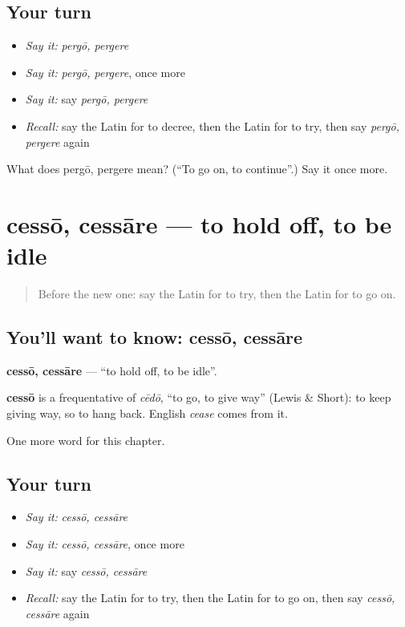 \subsection*{Your turn}
\begin{itemize}
\raggedright
  \item \emph{Say it:} \emph{pergō, pergere}
  \item \emph{Say it:} \emph{pergō, pergere}, once more
  \item \emph{Say it:} say \emph{pergō, pergere}
  \item \emph{Recall:} say the Latin for to decree, then the Latin for to try, then say \emph{pergō, pergere} again
\end{itemize}

\begin{tcolorbox}[breakable,colback=teal!4,colframe=teal!35!black,title={Before you move on}]
What does pergō, pergere mean? (\textquotedblleft{}To go on, to continue\textquotedblright{}.) Say it once more.
\end{tcolorbox}
\section[cessō, cessāre]{cessō, cessāre — to hold off, to be idle}

\label{lesson:LA-C229-cesso}



\begin{quote}
Before the new one: say the Latin for to try, then the Latin for to go on.
\end{quote}

\subsection*{You'll want to know: cessō, cessāre}
\textbf{cessō, cessāre} — \textquotedblleft{}to hold off, to be idle\textquotedblright{}.

\begin{cousinweb}
\textbf{cessō} is a frequentative of \emph{cēdō}, \textquotedblleft{}to go, to give way\textquotedblright{} (Lewis \& Short): to keep giving way, so to hang back. English \emph{cease} comes from it.
\end{cousinweb}

\begin{grammarlens}[title={What you've built}]
One more word for this chapter.
\end{grammarlens}

\subsection*{Your turn}
\begin{itemize}
\raggedright
  \item \emph{Say it:} \emph{cessō, cessāre}
  \item \emph{Say it:} \emph{cessō, cessāre}, once more
  \item \emph{Say it:} say \emph{cessō, cessāre}
  \item \emph{Recall:} say the Latin for to try, then the Latin for to go on, then say \emph{cessō, cessāre} again
\end{itemize}

